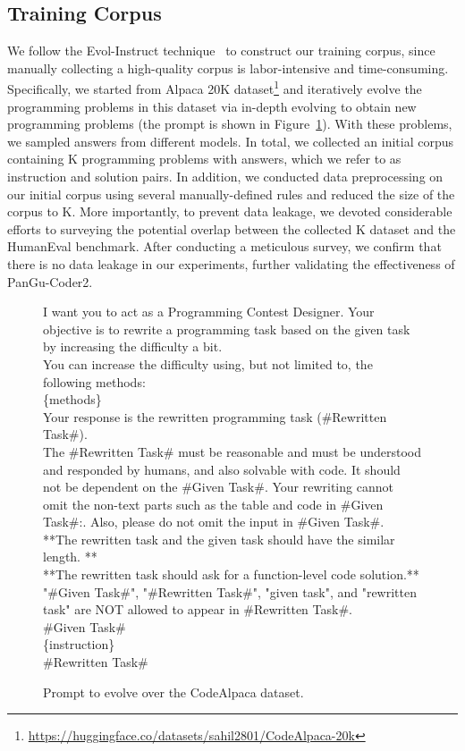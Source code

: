 \documentclass{article}
\newcommand{\pgcoder}{PanGu-Coder2\xspace}
\begin{document}
\subsection{Training Corpus}\label{training_corpus}

We follow the Evol-Instruct technique~\cite{wizardlm,wizardcoder} to construct our training corpus, since manually collecting a high-quality corpus is labor-intensive and time-consuming.
Specifically, we started from Alpaca 20K dataset\footnote{\url{https://huggingface.co/datasets/sahil2801/CodeAlpaca-20k}} and iteratively evolve the programming problems in this dataset via in-depth evolving to obtain new programming problems (the prompt is shown in Figure~\ref{fig:prompt}). With these problems, we sampled answers from different models. In total, we collected an initial corpus containing K programming problems with answers, which we refer to as instruction and solution pairs. In addition, we conducted data preprocessing on our initial corpus using several manually-defined rules and reduced the size of the corpus to K. 
More importantly, to prevent data leakage, we devoted considerable efforts to surveying the potential overlap between the collected K dataset and the HumanEval benchmark. After conducting a meticulous survey, we confirm that there is no data leakage in our experiments, further validating the effectiveness of \pgcoder.

\begin{figure}
    \centering
\begin{tcolorbox}[left=2pt,right=2pt,top=0pt,bottom=0pt]
I want you to act as a Programming Contest Designer. Your objective is to rewrite a programming task based on the given task by increasing the difficulty a bit.\\
You can increase the difficulty using, but not limited to, the following methods:\\
\{methods\} \\

Your response is the rewritten programming task (\#Rewritten Task\#).\\
The \#Rewritten Task\# must be reasonable and must be understood and responded by humans, and also solvable with code. It should not be dependent on the \#Given Task\#. Your rewriting cannot omit the non-text parts such as the table and code in \#Given Task\#:. Also, please do not omit the input in \#Given Task\#.\\
**The rewritten task and the given task should have the similar length. **\\
**The rewritten task should ask for a function-level code solution.**\\
"\#Given Task\#", "\#Rewritten Task\#", "given task", and "rewritten task" are NOT allowed to appear in \#Rewritten Task\#. \\
\#Given Task\# \\
\{instruction\} \\
\#Rewritten Task\#
\end{tcolorbox}
\caption{Prompt to evolve over the CodeAlpaca dataset.}
\label{fig:prompt}
\end{figure}
\end{document}
